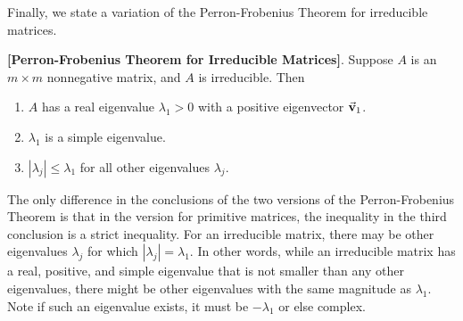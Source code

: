 Finally, we state a variation of the Perron-Frobenius Theorem
for irreducible matrices.
\begin{theorem}
\textrm{\textbf{[Perron-Frobenius Theorem for Irreducible Matrices]}}.
Suppose $A$ is an $m\times m$ nonnegative matrix, and $A$ is irreducible.
Then
\begin{enumerate}
\item $A$ has a real eigenvalue $\lambda_1>0$ with 
a positive eigenvector $\vec{\textbf{v}}_1$.
\item $\lambda_1$ is a simple eigenvalue.
\item $|\lambda_j| \le \lambda_1$ for all other eigenvalues
$\lambda_j$.
\end{enumerate}
\end{theorem}


The only difference in the conclusions of the two versions
of the Perron-Frobenius Theorem
is that in the version for primitive matrices, the inequality in the third
conclusion is a strict inequality.
For an irreducible matrix, there may be other eigenvalues $\lambda_j$
for which $|\lambda_j| = \lambda_1$.
In other words, while an irreducible matrix has a real, positive, and simple
eigenvalue that is not smaller than any other eigenvalues, there might be
other eigenvalues with the same magnitude as $\lambda_1$.  Note if such
an eigenvalue exists, it must be $-\lambda_1$ or else complex.

